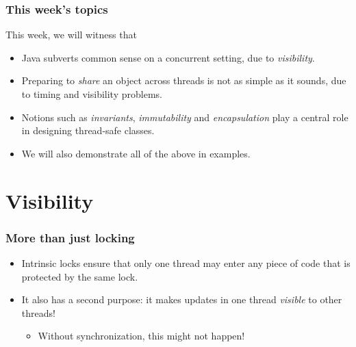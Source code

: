 \documentclass[xcolor={dvipsnames,svgnames},aspectratio=169]{beamer}
\begin{document}
\begin{frame}[fragile]
  \frametitle{This week's topics}

  This week, we will witness that

  \begin{itemize}
  \item[\faBook]<1-> Java subverts common sense
    on a concurrent setting, due to \emph{visibility}.
  \item[\faBook]<1-> Preparing to \emph{share} an object across threads
    is not as simple as it sounds, due to timing and visibility problems.
  \item[\faBook]<1-> Notions such as \emph{invariants}, \emph{immutability} and
    \emph{encapsulation} play a central role in designing thread-safe classes.
  \end{itemize}

  \begin{itemize}
  \item[\faUserInjured]<2-> We will also demonstrate all of the above in
    examples.
  \end{itemize}
\end{frame}


\section{Visibility}

\begin{frame}[fragile]
  \frametitle{More than just locking}

  \begin{itemize}
  \item[\faBook]<1-> Intrinsic locks ensure that only one thread may enter any
    piece of code that is protected by the same lock.
  \item[\faBook]<1-> It also has a second purpose: it makes updates in one
    thread \emph{visible} to other threads!
    \begin{itemize}
    \item[\faUserInjured]<2-> Without synchronization, this might not happen!
    \end{itemize}
  \end{itemize}

\end{frame}
\end{document}
